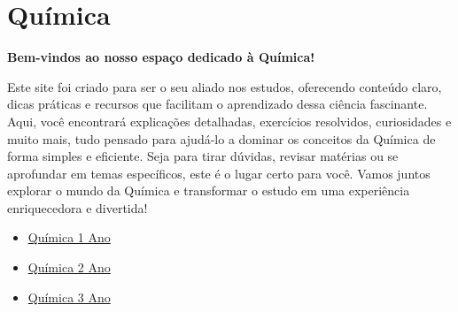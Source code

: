 \documentclass[11pt]{article}
\author{Itamar Barbosa de Lima}
\date{\today}
\title{}
\begin{document}
\tableofcontents

\section{Química}
\label{sec:org2d1098b}

\textbf{Bem-vindos ao nosso espaço dedicado à Química!}

Este site foi criado para ser o seu aliado nos estudos, oferecendo conteúdo claro, dicas práticas e recursos que facilitam o aprendizado dessa ciência fascinante. Aqui, você encontrará explicações detalhadas, exercícios resolvidos, curiosidades e muito mais, tudo pensado para ajudá-lo a dominar os conceitos da Química de forma simples e eficiente. Seja para tirar dúvidas, revisar matérias ou se aprofundar em temas específicos, este é o lugar certo para você. Vamos juntos explorar o mundo da Química e transformar o estudo em uma experiência enriquecedora e divertida!


\begin{itemize}
\item \href{Quimica-1.org}{Química 1 Ano}
\item \href{Quimica-2.org}{Química 2 Ano}
\item \href{Quimica-3.org}{Química 3 Ano}
\end{itemize}
\end{document}
